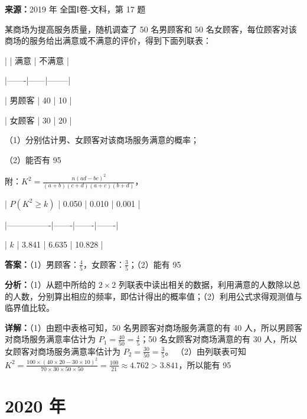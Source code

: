 \begin{question}[points=12]
\textbf{来源：}2019 年 全国I卷-文科，第 17 题\par
某商场为提高服务质量，随机调查了 50 名男顾客和 50 名女顾客，每位顾客对该商场的服务给出满意或不满意的评价，得到下面列联表：



| | 满意 | 不满意 |

|-------|------|--------|

| 男顾客 | 40 | 10 |

| 女顾客 | 30 | 20 |



（1）分别估计男、女顾客对该商场服务满意的概率；

（2）能否有 95%



附：$K^2 = \frac{n(ad-bc)^2}{(a+b)(c+d)(a+c)(b+d)}$，



| $P(K^2 \ge k)$ | 0.050 | 0.010 | 0.001 |

|----------------|-------|-------|-------|

| $k$ | 3.841 | 6.635 | 10.828 |
\begin{solution}
\textbf{答案：}（1）男顾客：$\frac{4}{5}$，女顾客：$\frac{3}{5}$；（2）能有 95%

\textbf{分析：}（1）从题中所给的 $2\times2$ 列联表中读出相关的数据，利用满意的人数除以总的人数，分别算出相应的频率，即估计得出的概率值；（2）利用公式求得观测值与临界值比较。

\textbf{详解：}（1）由题中表格可知，50 名男顾客对商场服务满意的有 40 人，所以男顾客对商场服务满意率估计为 $P_1 = \frac{40}{50} = \frac{4}{5}$；50 名女顾客对商场满意的有 30 人，所以女顾客对商场服务满意率估计为 $P_2 = \frac{30}{50} = \frac{3}{5}$。
（2）由列联表可知 $K^2 = \frac{100 \times (40 \times 20 - 30 \times 10)^2}{70 \times 30 \times 50 \times 50} = \frac{100}{21} \approx 4.762 > 3.841$，所以能有 95%
\end{solution}
\end{question}

\section*{2020 年}

